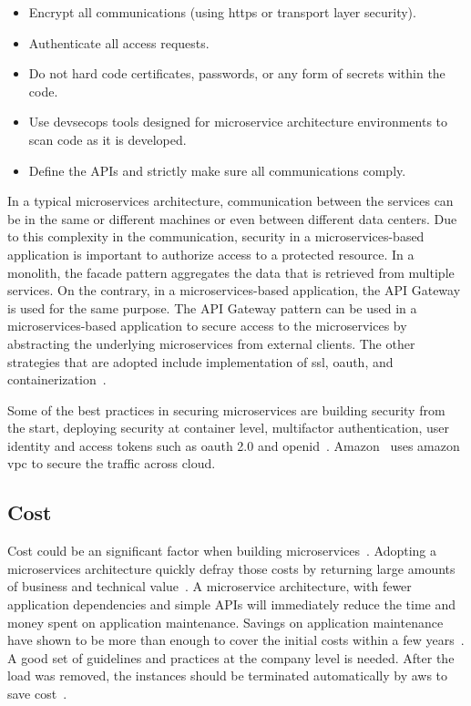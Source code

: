 \begin{itemize}
\item Encrypt all communications (using https or transport layer security).
\item Authenticate all access requests.
\item Do not hard code certificates, passwords, or any form of secrets within the code.
\item Use devsecops tools designed for microservice architecture environments to scan code as it is developed.
\item Define the APIs and strictly make sure all communications comply.

\end{itemize}

In a typical microservices architecture, communication between the services can be in the same or different machines or even between different data centers. Due to this complexity in the communication, security in a microservices-based application is important to authorize access to a protected resource.
In a monolith, the facade pattern aggregates the data that is retrieved from multiple services. On the contrary, in a microservices-based application, the API Gateway is used for the same purpose. The API Gateway pattern can be used in a microservices-based application to secure access to the microservices by abstracting the underlying microservices from external clients. The other strategies that are adopted include implementation of ssl, oauth, and containerization~\cite{Zaytev2018, tenev2019, Monterio2018}. 

\par Some of the best practices in securing microservices are building security from the start, deploying security at container level, multifactor authentication, user identity and access tokens such as oauth 2.0 and openid~\cite{Gonchar2017}. Amazon~\cite{Amazon} uses amazon vpc to secure the traffic across cloud.


\subsection{Cost}%
Cost could be an significant factor when building microservices~\cite{Koschel2017, Netflix, Michael2018}. 
%
Adopting a microservices architecture quickly defray those costs by returning large amounts of business and technical value~\cite{McElhiney2018, leo2019}. A microservice architecture, with fewer application dependencies and simple APIs will immediately reduce the time and money spent on application maintenance. Savings on application maintenance have shown to be more than enough to cover the initial costs within a few years~\cite{Otharson2019}. 
A good set of guidelines and practices at the company level is needed. After the load was removed, the instances should be terminated automatically by aws to save cost~\cite{McElhiney2018}. 

